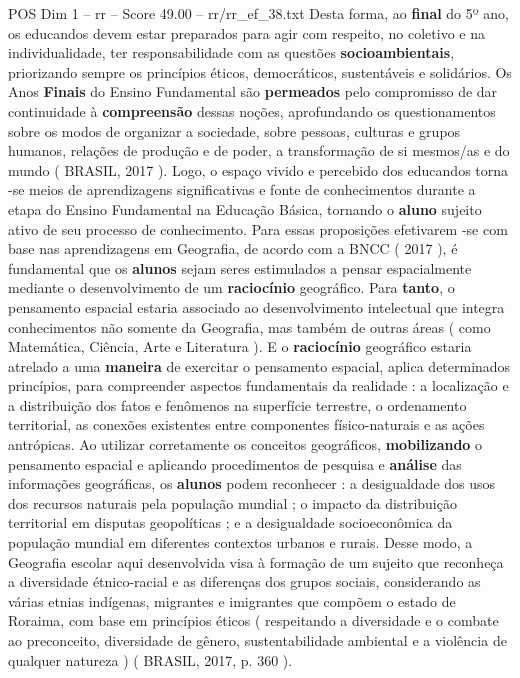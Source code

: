 \begin{textsample}{POS Dim 1 – rr – Score 49.00 – rr/rr\_ef\_38.txt}
Desta forma, ao \textbf{final} do 5º ano, os educandos devem estar preparados para agir com respeito, no coletivo e na individualidade, ter responsabilidade com as questões \textbf{socioambientais}, priorizando sempre os princípios éticos, democráticos, sustentáveis e solidários.
Os Anos \textbf{Finais} do Ensino Fundamental são \textbf{permeados} pelo compromisso de dar continuidade à \textbf{compreensão} dessas noções, aprofundando os questionamentos sobre os modos de organizar a sociedade, sobre pessoas, culturas e grupos humanos, relações de produção e de poder, a transformação de si mesmos/as e do mundo ( BRASIL, 2017 ).
Logo, o espaço vivido e percebido dos educandos torna -se meios de aprendizagens significativas e fonte de conhecimentos durante a etapa do Ensino Fundamental na Educação Básica, tornando o \textbf{aluno} sujeito ativo de seu processo de conhecimento.
Para essas proposições efetivarem -se com base nas aprendizagens em Geografia, de acordo com a BNCC ( 2017 ), é fundamental que os \textbf{alunos} sejam seres estimulados a pensar espacialmente mediante o desenvolvimento de um \textbf{raciocínio} geográfico.
Para \textbf{tanto}, o pensamento espacial estaria associado ao desenvolvimento intelectual que integra conhecimentos não somente da Geografia, mas também de outras áreas ( como Matemática, Ciência, Arte e Literatura ).
E o \textbf{raciocínio} geográfico estaria atrelado a uma \textbf{maneira} de exercitar o pensamento espacial, aplica determinados princípios, para compreender aspectos fundamentais da realidade : a localização e a distribuição dos fatos e fenômenos na superfície terrestre, o ordenamento territorial, as conexões existentes entre componentes físico-naturais e as ações antrópicas.
Ao utilizar corretamente os conceitos geográficos, \textbf{mobilizando} o pensamento espacial e aplicando procedimentos de pesquisa e \textbf{análise} das informações geográficas, os \textbf{alunos} podem reconhecer : a desigualdade dos usos dos recursos naturais pela população mundial ; o impacto da distribuição territorial em disputas geopolíticas ; e a desigualdade socioeconômica da população mundial em diferentes contextos urbanos e rurais.
Desse modo, a Geografia escolar aqui desenvolvida visa à formação de um sujeito que reconheça a diversidade étnico-racial e as diferenças dos grupos sociais, considerando as várias etnias indígenas, migrantes e imigrantes que compõem o estado de Roraima, com base em princípios éticos ( respeitando a diversidade e o combate ao preconceito, diversidade de gênero, sustentabilidade ambiental e a violência de qualquer natureza ) ( BRASIL, 2017, p. 360 ).

\end{textsample}
